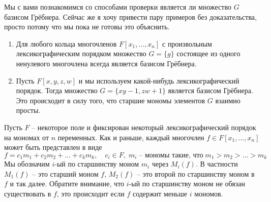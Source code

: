 \begin{examples}
Мы с вами познакомимся со способами проверки является ли множество $G$ базисом Грёбнера.
Сейчас же я хочу привести пару примеров без доказательства, просто потому что мы пока не готовы это объяснить.
\begin{enumerate}
\item Для любого кольца многочленов $F[x_1,\ldots,x_n]$ с произвольным лексикографическим порядком множество $G = \{g\}$ состоящее из одного ненулевого многочлена всегда является базисом Грёбнера.

\item Пусть $F[x,y,z,w]$ и мы используем какой-нибудь лексикографический порядок.
Тогда множество $G = \{xy - 1, zw + 1\}$ является базисом Грёбнера.
Это происходит в силу того, что старшие мономы элементов $G$ взаимно просты.
\end{enumerate}
\end{examples}


\begin{definition}
Пусть $F$ -- некоторое поле и фиксирован некоторый лексикографический порядок на мономах от $n$ переменных.
Как и раньше, каждый многочлен $f\in F[x_1,\ldots,x_n]$ может быть представлен в виде
\[
f = c_1 m_1 + c_2 m_2 + \ldots + c_k m_k,\quad c_i\in F,\;m_i\;\text{-- мономы такие, что}\; m_1 > m_2 >\ldots>m_k
\]
Мы обозначим $i$-ый по старшинству моном $m_i$ через $M_i(f)$.
В частности $M_1(f)$ -- это старший моном $f$, $M_2(f)$ -- это второй по старшинству моном в $f$ и так далее.
Обратите внимание, что $i$-ый по старшинству моном не обязан существовать в $f$, это происходит если $f$ содержит меньше $i$ мономов.
\end{definition}

